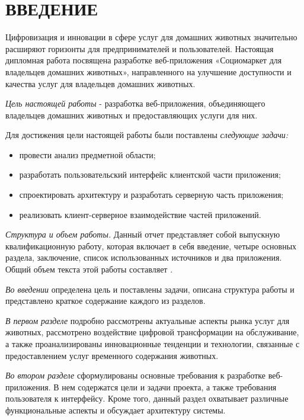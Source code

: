 \section*{ВВЕДЕНИЕ}

Цифровизация и инновации в сфере услуг для домашних животных значительно расширяют горизонты для предпринимателей и пользователей. Настоящая дипломная работа посвящена разработке веб-приложения «Социомаркет для владельцев домашних животных», направленного на улучшение доступности и качества услуг для владельцев домашних животных.

\emph{Цель настоящей работы} -\- разработка веб-приложения, объединяющего владельцев домашних животных и предоставляющих услуги для них. 

Для достижения цели настоящей работы были поставлены \emph{следующие задачи:}

\begin{itemize}
    \item провести анализ предметной области;
    \item разработать пользовательский интерфейс клиентской части приложения;
    \item спроектировать архитектуру и разработать серверную часть приложения;
    \item реализовать клиент-серверное взаимодействие частей приложений.
\end{itemize}

\emph{Структура и объем работы.} Данный отчет представляет собой выпускную квалификационную работу, которая включает в себя введение, четыре основных раздела, заключение, список использованных источников и два приложения. Общий объем текста этой работы составляет .

\emph{Во введении} определена цель и поставлены задачи, описана структура работы и представлено краткое содержание каждого из разделов.

\emph{В первом разделе} подробно рассмотрены актуальные аспекты рынка услуг для животных, рассмотрено воздействие цифровой трансформации на обслуживание, а также проанализированы инновационные тенденции и технологии, связанные с предоставлением услуг временного содержания животных.

\emph{Во втором разделе} сформулированы основные требования к разработке веб-приложения. В нем содержатся цели и задачи проекта, а также требования пользователя к интерфейсу. Кроме того, данный раздел охватывает различные функциональные аспекты и обсуждает архитектуру системы.

